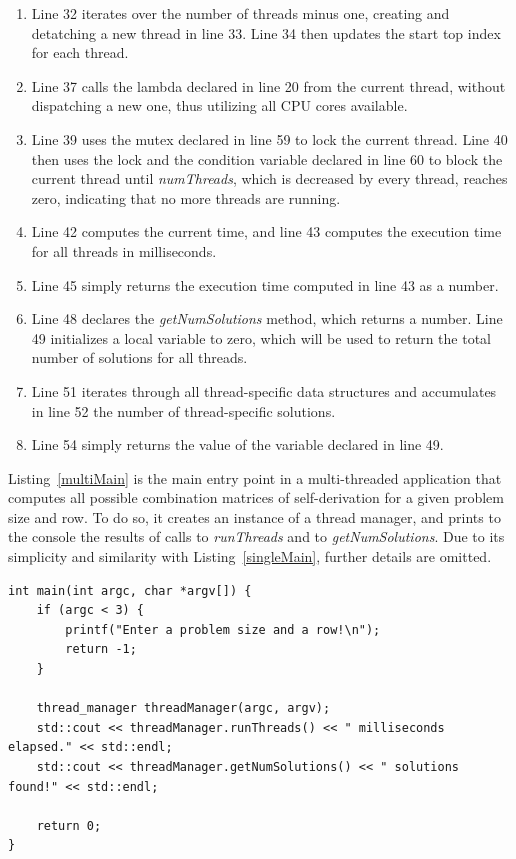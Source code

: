 \begin{enumerate}
\addtocounter{enumi}{4}
\item Line 32 iterates over the number of threads minus one, creating and detatching a new thread in line 33. Line 34 then updates the start top index for each thread.
\addtocounter{enumi}{4}
\item Line 37 calls the lambda declared in line 20 from the current thread, without dispatching a new one, thus utilizing all CPU cores available.
\addtocounter{enumi}{1}
\item Line 39 uses the mutex declared in line 59 to lock the current thread. Line 40 then uses the lock and the condition variable declared in line 60 to block the current thread until \emph{numThreads}, which is decreased by every thread, reaches zero, indicating that no more threads are running.
\addtocounter{enumi}{2}
\item Line 42 computes the current time, and line 43 computes the execution time for all threads in milliseconds.
\addtocounter{enumi}{2}
\item Line 45 simply returns the execution time computed in line 43 as a number.
\addtocounter{enumi}{2}
\item Line 48 declares the \emph{getNumSolutions} method, which returns a number. Line 49 initializes a local variable to zero, which will be used to return the total number of solutions for all threads.
\addtocounter{enumi}{2}
\item Line 51 iterates through all thread-specific data structures and accumulates in line 52 the number of thread-specific solutions.
\addtocounter{enumi}{2}
\item Line 54 simply returns the value of the variable declared in line 49.
\end{enumerate}


Listing~\ref{multiMain} is the main entry point in a multi-threaded application that computes all possible combination matrices of self-derivation for a given problem size and row. To do so, it creates an instance of a thread manager, and prints to the console the results of calls to \emph{runThreads} and to \emph{getNumSolutions}. Due to its simplicity and similarity with Listing~\ref{singleMain}, further details are omitted.

\begin{lstlisting}[caption={A multi-threaded command line tool.},label={multiMain}]
int main(int argc, char *argv[]) {
    if (argc < 3) {
        printf("Enter a problem size and a row!\n");
        return -1;
    }

    thread_manager threadManager(argc, argv);
    std::cout << threadManager.runThreads() << " milliseconds elapsed." << std::endl;
    std::cout << threadManager.getNumSolutions() << " solutions found!" << std::endl;

    return 0;
}
\end{lstlisting}

